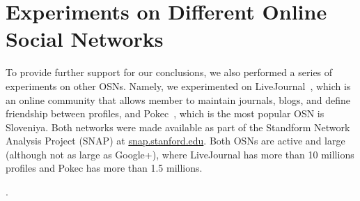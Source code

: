 \documentclass[prodmode,acmtecs]{acmsmall} %
\newcommand{\note}[2]{\textbf{\textsc{#1} says: \textit{#2}}}
\begin{document}


\section{Experiments on Different Online Social Networks}
\label{sec:otherNetworks}
To provide further support for our conclusions, we also performed a series of experiments on other OSNs. Namely, we experimented on LiveJournal~\cite{backstrom2006groupFormation,leskovec2009community}, which is an online community that allows member to maintain journals, blogs, and define friendship between profiles, and Pokec~\cite{takac2012data}, which is the most popular OSN is Sloveniya. Both networks were made available as part of the Standform Network Analysis Project (SNAP) at \url{snap.stanford.edu}. Both OSNs are active and large (although not as large as Google+), where LiveJournal has more than 10 millions profiles and Pokec has more than 1.5 millions. 




. %
\end{document}
